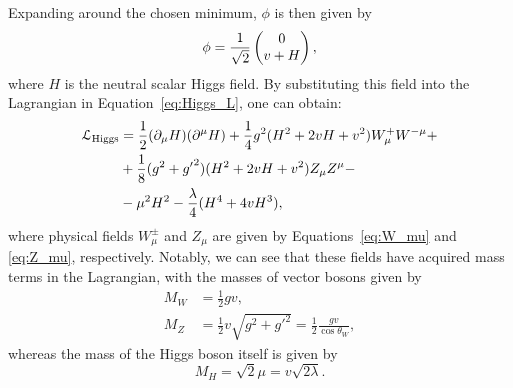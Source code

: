 Expanding around the chosen minimum, $\phi$ is then given by
\begin{equation}
\phi = \frac{1}{\sqrt{2}} \begin{pmatrix} 0 \\ v+H \end{pmatrix},
\end{equation}
where $H$ is the neutral scalar Higgs field. By substituting this field into the Lagrangian in
Equation~\ref{eq:Higgs_L}, one can obtain:
\begin{equation}
\begin{split}
\mathcal{L}_\textrm{Higgs} & = \frac{1}{2} (\partial_\mu H)(\partial^\mu H) + \frac{1}{4} g^2 (H^2 + 2vH + v^2) W^+_\mu
W^{-\mu} + \\ & + \frac{1}{8} (g^2 + {g'}^2)(H^2 + 2vH + v^2)Z_\mu Z^\mu - \\ & - \mu^2 H^2 - \frac{\lambda}{4} (H^4 +
4vH^3),
\end{split}
\label{eq:Higgs_L_final}
\end{equation}
where physical fields $W^{\pm}_\mu$ and $Z_\mu$ are given by Equations~\ref{eq:W_mu} and \ref{eq:Z_mu}, respectively.
Notably, we can see that these fields have acquired mass terms in the Lagrangian, with the masses of vector bosons given
by
\begin{subequations}
\begin{align}
M_W &= \frac{1}{2}gv, \\
M_Z &= \frac{1}{2}v\sqrt{g^2+{g'}^2} = \frac{1}{2} \frac{gv}{\cos{\theta_W}},
\end{align}
\end{subequations}
whereas the mass of the Higgs boson itself is given by
\begin{equation}
M_H = \sqrt{2} \mu = v \sqrt{2\lambda}.
\end{equation}



